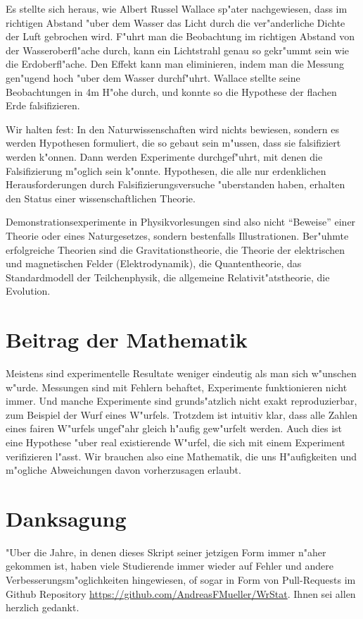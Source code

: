 Es stellte sich heraus, wie Albert Russel Wallace sp"ater nachgewiesen,
dass im richtigen Abstand "uber dem Wasser das Licht durch die
ver"anderliche Dichte der Luft gebrochen wird.
F"uhrt man die Beobachtung im richtigen Abstand von der Wasseroberfl"ache
durch, kann ein Lichtstrahl genau so gekr"ummt sein wie die Erdoberfl"ache.
Den Effekt kann man eliminieren, indem man die Messung gen"ugend hoch
"uber dem Wasser durchf"uhrt. 
Wallace stellte seine Beobachtungen in 4m H"ohe durch, und konnte
so die Hypothese der flachen Erde falsifizieren.

Wir halten fest: In den Naturwissenschaften wird nichts bewiesen,
sondern es werden Hypothesen formuliert, die so gebaut sein
m"ussen, dass sie falsifiziert werden k"onnen.
Dann werden Experimente durchgef"uhrt, mit denen die Falsifizierung
m"oglich sein k"onnte.
Hypothesen, die alle nur erdenklichen Herausforderungen durch
Falsifizierungsversuche "uberstanden haben, erhalten den Status
einer wissenschaftlichen Theorie.

Demonstrationsexperimente in Physikvorlesungen sind also nicht
``Beweise'' einer Theorie oder eines Naturgesetzes, sondern bestenfalls
Illustrationen.
Ber"uhmte erfolgreiche Theorien sind die Gravitationstheorie, die
Theorie der elektrischen und magnetischen Felder (Elektrodynamik),
die Quantentheorie, das Standardmodell der Teilchenphysik, die
allgemeine Relativit"atstheorie, die Evolution.

\section*{Beitrag der Mathematik}
Meistens sind experimentelle Resultate weniger eindeutig als man sich
w"unschen w"urde.
Messungen sind mit Fehlern behaftet, Experimente funktionieren nicht
immer.
Und manche Experimente sind grunds"atzlich nicht exakt reproduzierbar,
zum Beispiel der Wurf eines W"urfels.
Trotzdem ist intuitiv klar, dass alle Zahlen eines fairen W"urfels
ungef"ahr gleich h"aufig gew"urfelt werden.
Auch dies ist eine Hypothese "uber real existierende W"urfel, die
sich mit einem Experiment verifizieren l"asst.
Wir brauchen also eine Mathematik, die uns H"aufigkeiten und m"ogliche
Abweichungen davon vorherzusagen erlaubt.

\section*{Danksagung}
"Uber die Jahre, in denen dieses Skript seiner jetzigen Form immer n"aher
gekommen ist, haben viele Studierende immer wieder auf Fehler und andere
Verbesserungsm"oglichkeiten hingewiesen, of sogar in Form von Pull-Requests
im Github Repository \url{https://github.com/AndreasFMueller/WrStat}.
Ihnen sei allen herzlich gedankt.

